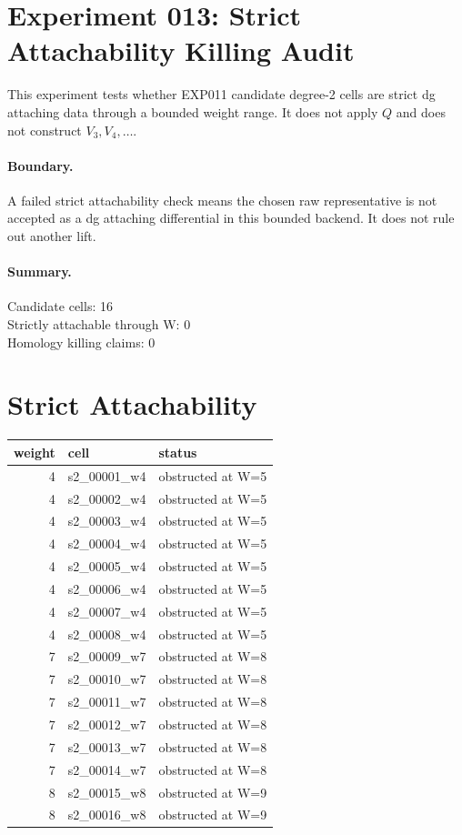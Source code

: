 \documentclass{article}
\begin{document}
\section*{Experiment 013: Strict Attachability Killing Audit}
This experiment tests whether EXP011 candidate degree-2 cells are strict dg attaching data through a bounded weight range. It does not apply $Q$ and does not construct $V_3,V_4,\ldots$.
\paragraph{Boundary.}
A failed strict attachability check means the chosen raw representative is not accepted as a dg attaching differential in this bounded backend. It does not rule out another lift.
\paragraph{Summary.}
Candidate cells: 16\\ Strictly attachable through W: 0\\ Homology killing claims: 0
\section*{Strict Attachability}
\begin{longtable}{rll}
\toprule weight & cell & status \\
\midrule
4 & s2\_00001\_w4 & obstructed at W=5 \\
4 & s2\_00002\_w4 & obstructed at W=5 \\
4 & s2\_00003\_w4 & obstructed at W=5 \\
4 & s2\_00004\_w4 & obstructed at W=5 \\
4 & s2\_00005\_w4 & obstructed at W=5 \\
4 & s2\_00006\_w4 & obstructed at W=5 \\
4 & s2\_00007\_w4 & obstructed at W=5 \\
4 & s2\_00008\_w4 & obstructed at W=5 \\
7 & s2\_00009\_w7 & obstructed at W=8 \\
7 & s2\_00010\_w7 & obstructed at W=8 \\
7 & s2\_00011\_w7 & obstructed at W=8 \\
7 & s2\_00012\_w7 & obstructed at W=8 \\
7 & s2\_00013\_w7 & obstructed at W=8 \\
7 & s2\_00014\_w7 & obstructed at W=8 \\
8 & s2\_00015\_w8 & obstructed at W=9 \\
8 & s2\_00016\_w8 & obstructed at W=9 \\
\bottomrule
\end{longtable}
\end{document}

